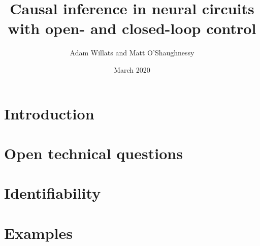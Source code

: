 \documentclass{article}
\title{Causal inference in neural circuits with open- and closed-loop control}
\author{Adam Willats and Matt O'Shaughnessy}
\date{March 2020}
\begin{document}
\maketitle

\section{Introduction}
\label{sec:introduction}


\section{Open technical questions}
\label{sec:questions}


\section{Identifiability}
\label{sec:identifiability}


\section{Examples}
\label{sec:examples}



\end{document}
